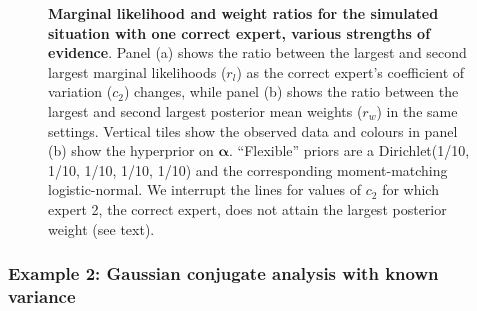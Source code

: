 \documentclass[a4paper, notitlepage, 11pt]{article}
\begin{document}
\begin{figure}[!ht]
\begin{center}
\end{center}
\caption{\textbf{Marginal likelihood and weight ratios for the simulated situation with one correct expert, various strengths of evidence}.
Panel (a) shows the ratio between the largest and second largest marginal likelihoods ($r_l$) as the correct expert's coefficient of variation ($c_2$) changes, while panel (b) shows the ratio between the largest and second largest posterior mean weights ($r_w$) in the same settings.
Vertical tiles show the observed data and colours in panel (b) show the hyperprior on $\boldsymbol\alpha$.
``Flexible'' priors are a Dirichlet(1/10, 1/10, 1/10, 1/10, 1/10) and the corresponding moment-matching logistic-normal.
We interrupt the lines for values of $c_2$ for which expert 2, the correct expert, does not attain the largest posterior weight (see text). 
}
\label{fig:one_correct_results_beta}
\end{figure}

\subsubsection{Example 2: Gaussian conjugate analysis with known variance}
\label{sec:learning_rate_Gaussian}
\end{document}
